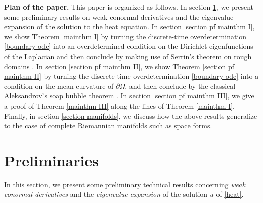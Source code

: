 \documentclass[a4paper,11pt]{article}
\numberwithin{equation}{section}
\begin{document}
\noindent\textbf{Plan of the paper.} This paper is organized as follows. In section \ref{section preliminaries}, we present some preliminary results on weak conormal derivatives and the eigenvalue expansion of the solution to the heat equation. In section \ref{section pf mainthm I}, we show Theorem \ref{mainthm I} by turning the discrete-time overdetermination \eqref{boundary odc} into an overdetermined condition on the Dirichlet eigenfunctions of the Laplacian and then conclude by making use of Serrin's theorem on rough domains \cite{figalli&zhang2025_serrin_rough_domains}.
In section \ref{section pf mainthm II}, we show Theorem \ref{section pf mainthm II} by turning the discrete-time overdetermination \eqref{boundary odc} into a condition on the mean curvature of $\partial\Omega$, and then conclude by the classical Aleksandrov's soap bubble theorem \cite{aleksandrov1958uniqueness}. 
In section \ref{section pf mainthm III}, we give a proof of Theorem \ref{mainthm III} along the lines of Theorem \ref{mainthm I}.
Finally, in section \ref{section manifolds}, we discuss how the above results generalize to the case of complete Riemannian manifolds such as space forms.


\section{Preliminaries}\label{section preliminaries}

In this section, we present some preliminary technical results concerning \emph{weak conormal derivatives} and the \emph{eigenvalue expansion} of the solution $u$ of \eqref{heat}. 
\end{document}
